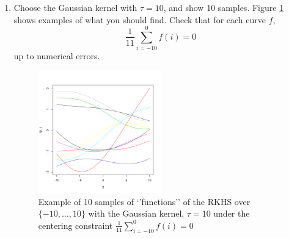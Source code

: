 \documentclass{article}[12pt]
\begin{document}
\begin{enumerate}
\item Choose the Gaussian kernel with $\tau=10$, and show 10 samples. Figure \ref{fig:Gauss_constraint} shows examples of what you should find. Check that for each curve $f$, 
\begin{equation}
\frac{1}{11}\sum_{i=-10}^0 f(i)=0
\end{equation}
up to numerical errors.  
\begin{figure}
\includegraphics[width=0.5\textwidth]{Gauss}
\caption{\label{fig:Gauss_constraint}Example of 10 samples of \lq{}\rq{}functions\rq\rq{} of the RKHS over $\{-10,\ldots,10\}$ with the Gaussian kernel, $\tau=10$ under the centering constraint $\frac{1}{11}\sum_{i=-10}^0 f(i)=0$}
\end{figure}
\end{enumerate}
\end{document}
